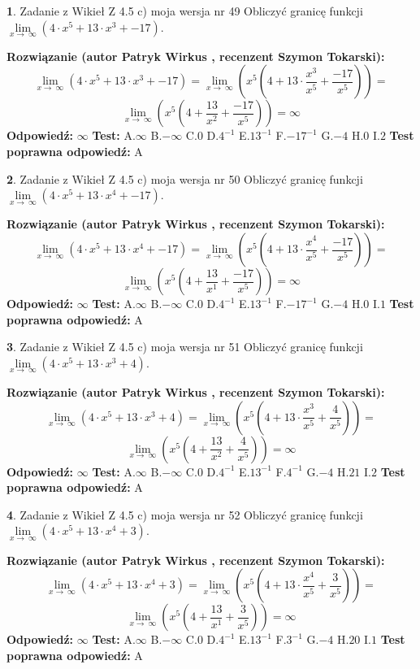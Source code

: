 \documentclass[12pt, a4paper]{article}
\theoremstyle{definition} %
\newtheorem{zad}{}
\newcommand{\zadStart}[1]{\begin{zad}#1\newline}
\newcommand{\zadStop}{\end{zad}}
\newcommand{\rozwStart}[2]{\noindent \textbf{Rozwiązanie (autor #1 , recenzent #2): }\newline}
\newcommand{\rozwStop}{\newline}
\newcommand{\odpStart}{\noindent \textbf{Odpowiedź:}\newline}
\newcommand{\odpStop}{\newline}
\newcommand{\testStart}{\noindent \textbf{Test:}\newline}
\newcommand{\testStop}{\newline}
\newcommand{\kluczStart}{\noindent \textbf{Test poprawna odpowiedź:}\newline}
\newcommand{\kluczStop}{\newline}
\begin{document}
\zadStart{Zadanie z Wikieł Z 4.5 c) moja wersja nr 49}
Obliczyć granicę funkcji  $\lim\limits_{x\to\ \infty}(4 \cdot x^{5}+13 \cdot x^{3}+-17)$.
\zadStop
\rozwStart{Patryk Wirkus}{Szymon Tokarski}
$$\lim\limits_{x\to\ \infty}(4 \cdot x^{5}+13 \cdot x^{3}+-17) = \lim\limits_{x\to\ \infty}(x^{5}(4 +13 \cdot \frac{x^{3}}{x^{5}}+\frac{-17}{x^{5}})) =$$ $$\lim\limits_{x\to\ \infty}(x^{5}(4 +\frac{13}{x^{2}}+\frac{-17}{x^{5}})) =\infty$$
\rozwStop
\odpStart
$\infty$
\odpStop
\testStart
A.$\infty$ B.$-\infty$ C.$0$ D.$4^{-1}$ E.$13^{-1}$
F.$-17^{-1}$ G.$-4$
H.$0$
I.$2$
\testStop
\kluczStart
A
\kluczStop



\zadStart{Zadanie z Wikieł Z 4.5 c) moja wersja nr 50}
Obliczyć granicę funkcji  $\lim\limits_{x\to\ \infty}(4 \cdot x^{5}+13 \cdot x^{4}+-17)$.
\zadStop
\rozwStart{Patryk Wirkus}{Szymon Tokarski}
$$\lim\limits_{x\to\ \infty}(4 \cdot x^{5}+13 \cdot x^{4}+-17) = \lim\limits_{x\to\ \infty}(x^{5}(4 +13 \cdot \frac{x^{4}}{x^{5}}+\frac{-17}{x^{5}})) =$$ $$\lim\limits_{x\to\ \infty}(x^{5}(4 +\frac{13}{x^{1}}+\frac{-17}{x^{5}})) =\infty$$
\rozwStop
\odpStart
$\infty$
\odpStop
\testStart
A.$\infty$ B.$-\infty$ C.$0$ D.$4^{-1}$ E.$13^{-1}$
F.$-17^{-1}$ G.$-4$
H.$0$
I.$1$
\testStop
\kluczStart
A
\kluczStop



\zadStart{Zadanie z Wikieł Z 4.5 c) moja wersja nr 51}
Obliczyć granicę funkcji  $\lim\limits_{x\to\ \infty}(4 \cdot x^{5}+13 \cdot x^{3}+4)$.
\zadStop
\rozwStart{Patryk Wirkus}{Szymon Tokarski}
$$\lim\limits_{x\to\ \infty}(4 \cdot x^{5}+13 \cdot x^{3}+4) = \lim\limits_{x\to\ \infty}(x^{5}(4 +13 \cdot \frac{x^{3}}{x^{5}}+\frac{4}{x^{5}})) =$$ $$\lim\limits_{x\to\ \infty}(x^{5}(4 +\frac{13}{x^{2}}+\frac{4}{x^{5}})) =\infty$$
\rozwStop
\odpStart
$\infty$
\odpStop
\testStart
A.$\infty$ B.$-\infty$ C.$0$ D.$4^{-1}$ E.$13^{-1}$
F.$4^{-1}$ G.$-4$
H.$21$
I.$2$
\testStop
\kluczStart
A
\kluczStop



\zadStart{Zadanie z Wikieł Z 4.5 c) moja wersja nr 52}
Obliczyć granicę funkcji  $\lim\limits_{x\to\ \infty}(4 \cdot x^{5}+13 \cdot x^{4}+3)$.
\zadStop
\rozwStart{Patryk Wirkus}{Szymon Tokarski}
$$\lim\limits_{x\to\ \infty}(4 \cdot x^{5}+13 \cdot x^{4}+3) = \lim\limits_{x\to\ \infty}(x^{5}(4 +13 \cdot \frac{x^{4}}{x^{5}}+\frac{3}{x^{5}})) =$$ $$\lim\limits_{x\to\ \infty}(x^{5}(4 +\frac{13}{x^{1}}+\frac{3}{x^{5}})) =\infty$$
\rozwStop
\odpStart
$\infty$
\odpStop
\testStart
A.$\infty$ B.$-\infty$ C.$0$ D.$4^{-1}$ E.$13^{-1}$
F.$3^{-1}$ G.$-4$
H.$20$
I.$1$
\testStop
\kluczStart
A
\kluczStop
\end{document}
